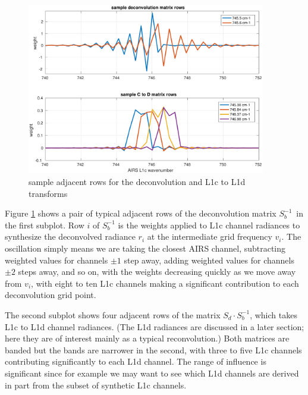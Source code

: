 \documentclass[11pt]{article}
\begin{document}


\begin{figure} %
  \centering
  \includegraphics[height=7.5cm]{figures/airs_decon_basis.pdf}
  \caption{sample adjacent rows for the deconvolution and L1c to L1d
    transforms}
  \label{dbasis}
\end{figure}

Figure \ref{dbasis} shows a pair of typical adjacent rows of the
deconvolution matrix $S_b^{-1}$\, in the first subplot.  Row $i$ of
$S_b^{-1}$ is the weights applied to L1c channel radiances to
synthesize the deconvolved radiance $r_i$ at the intermediate grid
frequency $v_i$.  The oscillation simply means we are taking the
closest AIRS channel, subtracting weighted values for channels $\pm
1$ step away, adding weighted values for channels $\pm 2$ steps
away, and so on, with the weights decreasing quickly as we move away
from $v_i$, with eight to ten L1c channels making a significant
contribution to each deconvolution grid point.

The second subplot shows four adjacent rows of the matrix 
$S_d \cdot S_b^{-1}$, which takes L1c to L1d channel radiances.
(The L1d radiances are discussed in a later section; here they are
of interest mainly as a typical reconvolution.)  Both matrices are
banded but the bands are narrower in the second, with three to five
L1c channels contributing significantly to each L1d channel.  
The range of influence is significant since for example we may want
to see which L1d channels are derived in part from the subset of
synthetic L1c channels.
\end{document}
